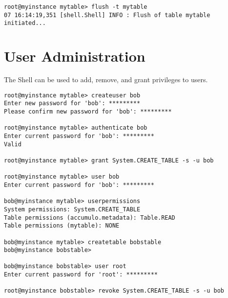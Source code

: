 \begingroup\fontsize{8pt}{8pt}\selectfont\begin{verbatim}
root@myinstance mytable> flush -t mytable
07 16:14:19,351 [shell.Shell] INFO : Flush of table mytable
initiated...
\end{verbatim}\endgroup

\section{User Administration}

The Shell can be used to add, remove, and grant privileges to users.

\begingroup\fontsize{8pt}{8pt}\selectfont\begin{verbatim}
root@myinstance mytable> createuser bob
Enter new password for 'bob': *********
Please confirm new password for 'bob': *********

root@myinstance mytable> authenticate bob
Enter current password for 'bob': *********
Valid

root@myinstance mytable> grant System.CREATE_TABLE -s -u bob

root@myinstance mytable> user bob
Enter current password for 'bob': *********

bob@myinstance mytable> userpermissions
System permissions: System.CREATE_TABLE
Table permissions (accumulo.metadata): Table.READ
Table permissions (mytable): NONE

bob@myinstance mytable> createtable bobstable
bob@myinstance bobstable>

bob@myinstance bobstable> user root
Enter current password for 'root': *********

root@myinstance bobstable> revoke System.CREATE_TABLE -s -u bob
\end{verbatim}\endgroup


